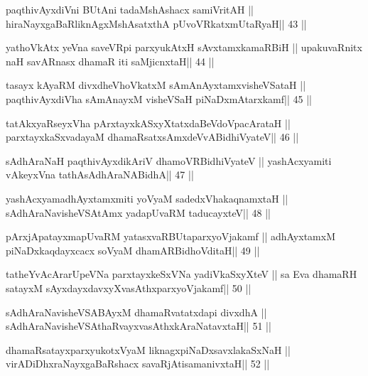 \begin{shl}
paqthivAyxdiVni BUtAni tadaMshAshacx samiVritAH ||
hiraNayxgaBaRliknAgxMshAsatxthA pUvoVRkatxmUtaRyaH\hfill || 43 ||
\end{shl}

\begin{shl}
yathoVkAtx yeVna saveVR\s pi parxyukAtxH sAvxtamxkamaRBiH ||
upakuvaRnitx naH savARnasx dhamaR iti saMjicnxtaH\hfill || 44 ||
\end{shl}

\begin{shl}
tasayx kAyaRM divxdheVhoVkatxM sAmAnAyxtamxvisheVSataH ||
paqthivAyxdiVha sAmAnayxM visheVSaH piNaDxmAtarxkamf\hfill || 45 ||
\end{shl}

\begin{shl}
tatAkxyaRseyxVha pArxtayxkASxyXtatxdaBeVdoVpacArataH ||
parxtayxkaSxvadayaM dhamaRsatxsAmxdeVvABidhiVyateV\hfill || 46 ||
\end{shl}

\begin{shl}
sAdhAraNaH paqthivAyxdikAriV dhamoVR\s BidhiVyateV ||
yashAcxyamiti vAkeyxVna tathA\s sAdhAraNABidhA\hfill || 47 ||
\end{shl}

\begin{shl}
yashAcxyamadhAyxtamxmiti yoV\s yaM sadedxVhakaqnamxtaH ||
sAdhAraNavisheVSAtAmx yadapUvaRM taducayxteV\hfill || 48 ||
\end{shl}

\begin{shl}
pArxjApatayxmapUvaRM yatasxvaRBUtaparxyoVjakamf ||
adhAyxtamxM piNaDxkaqdayxcacx soV\s yaM dhamARBidhoVditaH\hfill || 49 ||
\end{shl}

\begin{shl}
tatheYvA\s\s cArarUpeVNa parxtayxkeSxVNa yadiVkaSxyXteV ||
sa Eva  dhamaRH satayxM sAyxdayxdavxyXvasAthxparxyoVjakamf\hfill || 50 ||
\end{shl}

\begin{shl}
sAdhAraNavisheVSABAyxM dhamaRvatatxdapi divxdhA ||
sAdhAraNavisheVSAthaRvayxvasAthxkAraNatavxtaH\hfill || 51 ||
\end{shl}

\begin{shl}
dhamaRsatayxparxyukotxV\s yaM liknagxpiNaDxsavxlakaSxNaH ||
virADiDhxraNayxgaBaRshacx savaRjAtisamanivxtaH\hfill || 52 ||
\end{shl}

